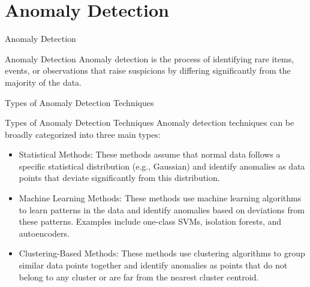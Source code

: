 \documentclass[hyperref={pdfpagelabels=false},aspectratio=169]{beamer}
\begin{document}
\section{Anomaly Detection}
\label{sec:org4e1487d}
\begin{frame}[label={sec:org4d95fbd}]{Anomaly Detection}
\begin{block}{Anomaly Detection}
\pause
\alert{Anomaly detection} is the process of identifying rare items, events, or observations that raise suspicions by differing significantly from the majority of the data.
\end{block}
\end{frame}
\begin{frame}[label={sec:org7562253}]{Types of Anomaly Detection Techniques}
\begin{block}{Types of Anomaly Detection Techniques}
\pause
Anomaly detection techniques can be broadly categorized into three main types:
\begin{itemize}[<+->]
\item \alert{Statistical Methods}: These methods assume that normal data follows a specific statistical distribution (e.g., Gaussian) and identify anomalies as data points that deviate significantly from this distribution.
\item \alert{Machine Learning Methods}: These methods use machine learning algorithms to learn patterns in the data and identify anomalies based on deviations from these patterns. Examples include one-class SVMs, isolation forests, and autoencoders.
\item \alert{Clustering-Based Methods}: These methods use clustering algorithms to group similar data points together and identify anomalies as points that do not belong to any cluster or are far from the nearest cluster centroid.
\end{itemize}
\end{block}
\end{frame}
\end{document}
